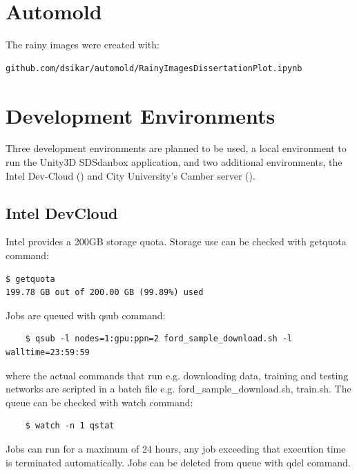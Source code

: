 \section{Automold}
The rainy images were created with:  
\begin{verbatim}
github.com/dsikar/automold/RainyImagesDissertationPlot.ipynb
\end{verbatim}

\section{Development Environments}

Three development environments are planned to be used, a local environment to run the Unity3D SDSdanbox application, and two additional environments, the Intel Dev-Cloud (\cite{IntelDevCloud2020}) and City University's Camber server (\cite{Camber2019}).

\subsection{Intel DevCloud}

Intel provides a 200GB storage quota. Storage use can be checked with getquota command:
\begin{verbatim}
$ getquota
199.78 GB out of 200.00 GB (99.89%) used   
\end{verbatim}
Jobs are queued with qsub command:
\begin{verbatim}
    $ qsub -l nodes=1:gpu:ppn=2 ford_sample_download.sh -l walltime=23:59:59
\end{verbatim}
where the actual commands that run e.g. downloading data, training and testing networks are scripted in a batch file e.g. ford\_sample\_download.sh, train.sh.   
The queue can be checked with watch command:
\begin{verbatim}
    $ watch -n 1 qstat
\end{verbatim}
Jobs can run for a maximum of 24 hours, any job exceeding that execution time is terminated automatically. Jobs can be deleted from queue with qdel command.

